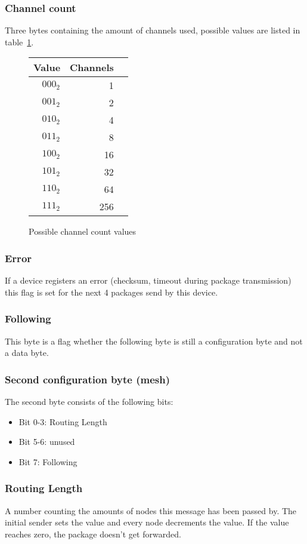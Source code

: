 \documentclass{scrreprt}
\begin{document}
\subsubsection{Channel count}
Three bytes containing the amount of channels used, possible values are
listed in table~\ref{fig:channelValues}.

\begin{figure}[H]
   \centering
   \begin{tabular}{rrr}
     \toprule
     Value & Channels \\
     \midrule
     $000_2$ & 1 \\
     $001_2$ & 2 \\
     $010_2$ & 4 \\
     $011_2$ & 8 \\
     $100_2$ & 16 \\
     $101_2$ & 32 \\
     $110_2$ & 64 \\
     $111_2$ & 256 \\
     \bottomrule
   \end{tabular}
   \caption{Possible channel count values}
   \label{fig:channelValues}
\end{figure}

\subsubsection{Error}
If a device registers an error (checksum, timeout during package
transmission) this flag is set for the next 4 packages send by this device.

\subsubsection{Following}
This byte is a flag whether the following byte is still a configuration
byte and not a data byte.

\subsubsection{Second configuration byte (mesh)}
The second byte consists of the following bits:
\begin{itemize}
  \item Bit 0-3: Routing Length
  \item Bit 5-6: unused
  \item Bit 7: Following
\end{itemize}

\subsubsection{Routing Length}
A number counting the amounts of nodes this message has been passed by. The
initial sender sets the value and every node decrements the value. If the
value reaches zero, the package doesn't get forwarded.
\end{document}

